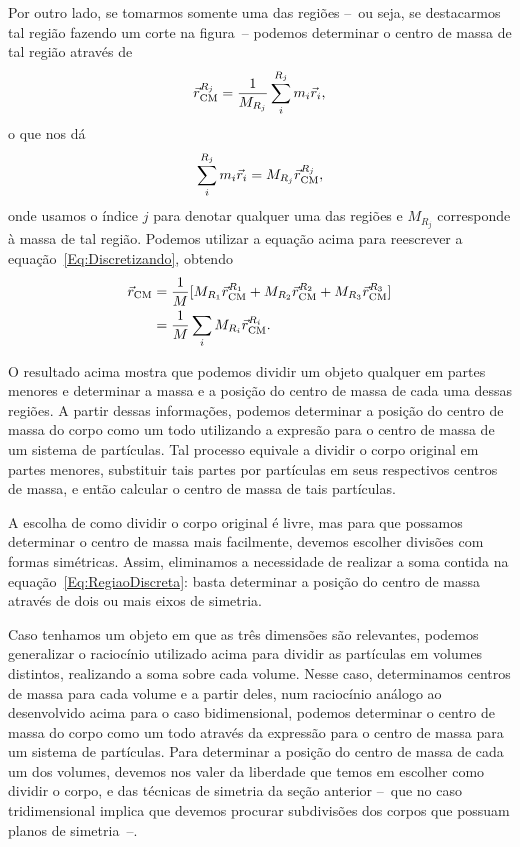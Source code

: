 Por outro lado, se tomarmos somente uma das regiões --~ou seja, se destacarmos tal região fazendo um corte na figura~-- podemos determinar o centro de massa de tal região através de
\begin{equation}
    \vec{r}_{\rm{CM}}^{R_j} = \frac{1}{M_{R_j}} \sum_{i}^{R_j} m_i \vec{r}_i,
\end{equation}
%
o que nos dá
\begin{equation}\label{Eq:RegiaoDiscreta}
    \sum_{i}^{R_j} m_i \vec{r}_i = M_{R_j} \vec{r}_{\rm{CM}}^{R_j},
\end{equation}
%
onde usamos o índice $j$ para denotar qualquer uma das regiões e $M_{R_j}$ corresponde à massa de tal região. Podemos utilizar a equação acima para reescrever a equação~\eqref{Eq:Discretizando}, obtendo
\begin{align}
    \vec{r}_{\rm{CM}} &= \frac{1}{M} [M_{R_1} \vec{r}_{\rm{CM}}^{R_1} + M_{R_2} \vec{r}_{\rm{CM}}^{R_2} + M_{R_3} \vec{r}_{\rm{CM}}^{R_3}] \\
    &= \frac{1}{M} \sum_{i} M_{R_i} \vec{r}_{\rm{CM}}^{R_i} \label{Eq:Discretizado}.
\end{align}

O resultado acima mostra que podemos dividir um objeto qualquer em partes menores e determinar a massa e a posição do centro de massa de cada uma dessas regiões. A partir dessas informações, podemos determinar a posição do centro de massa do corpo como um todo utilizando a expresão para o centro de massa de um sistema de partículas. Tal processo equivale a dividir o corpo original em partes menores, substituir tais partes por partículas em seus respectivos centros de massa, e então calcular o centro de massa de tais partículas.

A escolha de como dividir o corpo original é livre, mas para que possamos determinar o centro de massa mais facilmente, devemos escolher divisões com formas simétricas. Assim, eliminamos a necessidade de realizar a soma contida na equação~\eqref{Eq:RegiaoDiscreta}: basta determinar a posição do centro de massa através de dois ou mais eixos de simetria.

Caso tenhamos um objeto em que as três dimensões são relevantes, podemos generalizar o raciocínio utilizado acima para dividir as partículas em volumes distintos, realizando a soma sobre cada volume. Nesse caso, determinamos centros de massa para cada volume e a partir deles, num raciocínio análogo ao desenvolvido acima para o caso bidimensional, podemos determinar o centro de massa do corpo como um todo através da expressão para o centro de massa para um sistema de partículas. Para determinar a posição do centro de massa de cada um dos volumes, devemos nos valer da liberdade que temos em escolher como dividir o corpo, e das técnicas de simetria da seção anterior --~que no caso tridimensional implica que devemos procurar subdivisões dos corpos que possuam planos de simetria~--.

